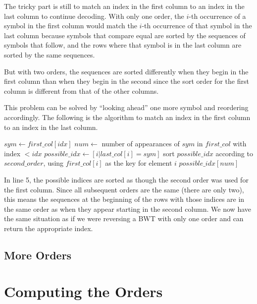 \documentclass[a4paper]{scrreprt}
\begin{document}
The tricky part is still to match an index in the first column to an index in
the last column to continue decoding. With only one order, the \(i\)-th
occurrence of a symbol in the first column would match the \(i\)-th occurrence
of that symbol in the last column because symbols that compare equal are sorted
by the sequences of symbols that follow, and the rows where that symbol is in
the last column are sorted by the same sequences.

But with two orders, the sequences are sorted differently when they begin in the
first column than when they begin in the second since the sort order for the
first column is different from that of the other columns.

This problem can be solved by ``looking ahead'' one more symbol and reordering
accordingly. The following is the algorithm to match an index in the first
column to an index in the last column.

\begin{algorithmic}[1]
\State $sym \gets first\_col[idx]$
\State $num \gets$ number of appearances of $sym$ in $first\_col$ with index $<
idx$
\State $possible\_idx \gets [i | last\_col[i] = sym]$
\State sort $possible\_idx$ according to $second\_order$, using $first\_col[i]$
as the key for element $i$
\State \Return $possible\_idx[num]$
\EndProcedure
\end{algorithmic}

In line 5, %
the possible indices are sorted as though the second order was used for the
first column. Since all subsequent orders are the same (there are only two),
this means the sequences at the beginning of the rows with those indices are in
the same order as when they appear starting in the second column. We now have
the same situation as if we were reversing a BWT with only one order and can
return the appropriate index.


\subsection{More Orders}

\section{Computing the Orders}
\end{document}
